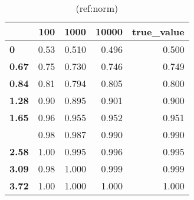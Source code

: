 \documentclass[
]{article}
\begin{document}
\begin{table}

\caption{\label{tab:norm}(ref:norm)}
\centering
\begin{tabular}[t]{>{\bfseries}lrrrr}
\toprule
  & 100 & 1000 & 10000 & true\_value\\
\midrule
0 & 0.53 & 0.510 & 0.496 & 0.500\\
0.67 & 0.75 & 0.730 & 0.746 & 0.749\\
0.84 & 0.81 & 0.794 & 0.805 & 0.800\\
1.28 & 0.90 & 0.895 & 0.901 & 0.900\\
1.65 & 0.96 & 0.955 & 0.952 & 0.951\\
\addlinespace
2.32 & 0.98 & 0.987 & 0.990 & 0.990\\
2.58 & 1.00 & 0.995 & 0.996 & 0.995\\
3.09 & 0.98 & 1.000 & 0.999 & 0.999\\
3.72 & 1.00 & 1.000 & 1.000 & 1.000\\
\bottomrule
\end{tabular}
\end{table}
\end{document}
